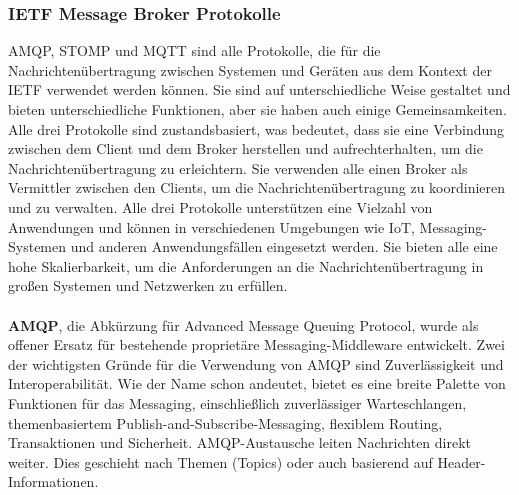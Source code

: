 \documentclass[../vs-script-first-v01.tex]{subfiles}
\begin{document}
\subsubsection{IETF Message Broker Protokolle}

AMQP, STOMP und MQTT sind alle Protokolle, die für die Nachrichtenübertragung zwischen Systemen und Geräten aus dem Kontext der IETF verwendet werden können. Sie sind auf unterschiedliche Weise gestaltet und bieten unterschiedliche Funktionen, aber sie haben auch einige Gemeinsamkeiten. Alle drei Protokolle sind zustandsbasiert, was bedeutet, dass sie eine Verbindung zwischen dem Client und dem Broker herstellen und aufrechterhalten, um die Nachrichtenübertragung zu erleichtern. Sie verwenden alle einen Broker als Vermittler zwischen den Clients, um die Nachrichtenübertragung zu koordinieren und zu verwalten.
Alle drei Protokolle unterstützen eine Vielzahl von Anwendungen und können in verschiedenen Umgebungen wie IoT, Messaging-Systemen und anderen Anwendungsfällen eingesetzt werden.
Sie bieten alle eine hohe Skalierbarkeit, um die Anforderungen an die Nachrichtenübertragung in großen Systemen und Netzwerken zu erfüllen. 
\\\\
\textbf{AMQP}, die Abkürzung für Advanced Message Queuing Protocol, wurde als offener Ersatz für bestehende proprietäre Messaging-Middleware entwickelt. Zwei der wichtigsten Gründe für die Verwendung von AMQP sind Zuverlässigkeit und Interoperabilität. Wie der Name schon andeutet, bietet es eine breite Palette von Funktionen für das Messaging, einschließlich zuverlässiger Warteschlangen, themenbasiertem Publish-and-Subscribe-Messaging, flexiblem Routing, Transaktionen und Sicherheit. AMQP-Austausche leiten Nachrichten direkt weiter. Dies geschieht nach Themen (Topics) oder auch basierend auf Header-Informationen.
\end{document}
